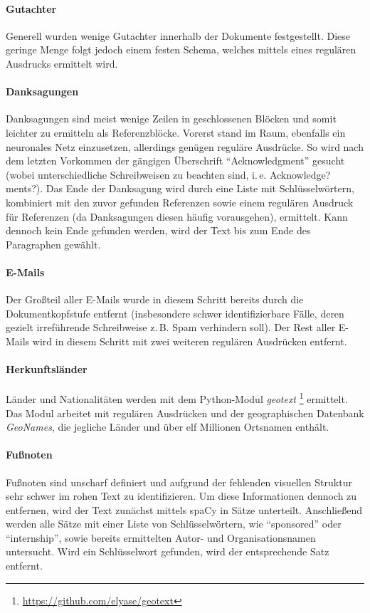 \documentclass[bachelor,german]{info1thesis}
\begin{document}
\paragraph{Gutachter} Generell wurden wenige Gutachter innerhalb der Dokumente festgestellt. Diese geringe Menge folgt jedoch einem festen Schema, welches mittels eines regulären Ausdrucks ermittelt wird.
\paragraph{Danksagungen} Danksagungen sind meist wenige Zeilen in geschlossenen Blöcken und somit leichter zu ermitteln als Referenzblöcke. Vorerst stand im Raum, ebenfalls ein neuronales Netz einzusetzen, allerdings genügen reguläre Ausdrücke. So wird nach dem letzten Vorkommen der gängigen Überschrift ``Acknowledgment'' gesucht (wobei unterschiedliche Schreibweisen zu beachten sind, i.\,e. Acknowledge?ments?). Das Ende der Danksagung wird durch eine Liste mit Schlüsselwörtern, kombiniert mit den zuvor gefunden Referenzen sowie einem regulären Ausdruck für Referenzen (da Danksagungen diesen häufig vorausgehen), ermittelt. Kann dennoch kein Ende gefunden werden, wird der Text bis zum Ende des Paragraphen gewählt.
\paragraph{E-Mails} Der Großteil aller E-Mails wurde in diesem Schritt bereits durch die Dokumentkopfstufe entfernt (insbesondere schwer identifizierbare Fälle, deren gezielt irreführende Schreibweise z.\,B. Spam verhindern soll). Der Rest aller E-Mails wird in diesem Schritt mit zwei weiteren regulären Ausdrücken entfernt.
\paragraph{Herkunftsländer} Länder und Nationalitäten werden mit dem Python-Modul \textit{geotext} \footnote{\url{https://github.com/elyase/geotext}} ermittelt. Das Modul arbeitet mit regulären Ausdrücken und der geographischen Datenbank \textit{GeoNames}, die jegliche Länder und über elf Millionen Ortsnamen enthält.
\paragraph{Fußnoten} Fußnoten sind unscharf definiert und aufgrund der fehlenden visuellen Struktur sehr schwer im rohen Text zu identifizieren. Um diese Informationen dennoch zu entfernen, wird der Text zunächst mittels spaCy in Sätze unterteilt. Anschließend werden alle Sätze mit einer Liste von Schlüsselwörtern, wie ``sponsored'' oder ``internship'', sowie bereits ermittelten Autor- und Organisationsnamen untersucht. Wird ein Schlüsselwort gefunden, wird der entsprechende Satz entfernt.
\end{document}
